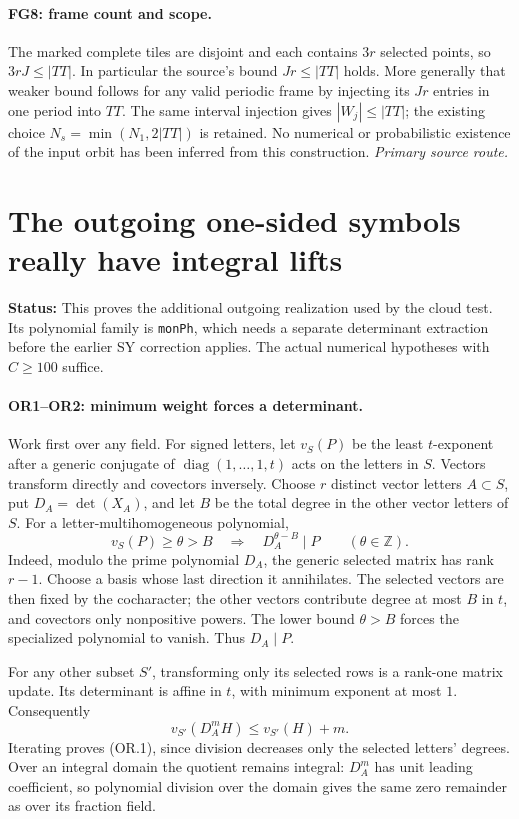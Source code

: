 \documentclass[11pt,a4paper]{article}
\numberwithin{equation}{section}
\theoremstyle{remark}\newtheorem{remark}[theorem]{Remark}
\newcommand{\status}[1]{\textbf{Status:} #1}
\begin{document}
\paragraph{FG8: frame count and scope.}
The marked complete tiles are disjoint and each contains $3r$ selected
points, so $3rJ\le|TT|$. In particular the source's bound
$Jr\le|TT|$ holds. More generally that weaker bound follows for any
valid periodic frame by injecting its $Jr$ entries in one period into
$TT$. The same interval injection gives $|W_j|\le|TT|$; the existing
choice $N_s=\min(N_1,2|TT|)$ is retained. No numerical or probabilistic
existence of the input orbit has been inferred from this construction.
\noindent\textit{Primary source route.}\cite{frames-actual}


\section{The outgoing one-sided symbols really have integral lifts}
\label{sec:outgoing-realization}

\status{This proves the additional outgoing realization used by the cloud
test. Its polynomial family is \texttt{monPh}, which needs a separate
determinant extraction before the earlier SY correction applies. The
actual numerical hypotheses with $C\ge100$ suffice.}

\paragraph{OR1--OR2: minimum weight forces a determinant.}
Work first over any field. For signed letters, let $v_S(P)$ be the least
$t$-exponent after a generic conjugate of
$\operatorname{diag}(1,\ldots,1,t)$ acts on the letters in $S$.
Vectors transform directly and covectors inversely. Choose $r$ distinct
vector letters $A\subset S$, put $D_A=\det(X_A)$, and let
$B$ be the total degree in the other vector letters of $S$.
For a letter-multihomogeneous polynomial,
\[
 v_S(P)\ge\theta>B
 \quad\Longrightarrow\quad D_A^{\theta-B}\mid P
 \qquad(\theta\in\mathbb Z).                              \tag{OR.1}
\]
Indeed, modulo the prime polynomial $D_A$, the generic selected matrix has
rank $r-1$. Choose a basis whose last direction it annihilates. The selected
vectors are then fixed by the cocharacter; the other vectors contribute
degree at most $B$ in $t$, and covectors only nonpositive powers.
The lower bound $\theta>B$ forces the specialized polynomial to vanish.
Thus $D_A\mid P$.

For any other subset $S'$, transforming only its selected rows is a
rank-one matrix update. Its determinant is affine in $t$, with minimum
exponent at most $1$. Consequently
\[
 v_{S'}(D_A^mH)\le v_{S'}(H)+m.                           \tag{OR.2}
\]
Iterating proves (OR.1), since division decreases only the selected
letters' degrees. Over an integral domain the quotient remains integral:
$D_A^m$ has unit leading coefficient, so polynomial division over the
domain gives the same zero remainder as over its fraction field.
\end{document}
